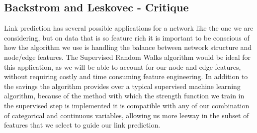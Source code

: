 \subsection{Backstrom and Leskovec - Critique}

\vspace{5mm}
\noindent
Link prediction has several possible applications for a network like the one 
we are considering, but on data that is so feature rich it is important to be 
conscious of how the algorithm we use is handling the balance between network 
structure and node/edge features.  The Supervised Random Walks algorithm would
be ideal for this application, as we will be able to account for our node and 
edge features, without requiring costly and time consuming feature engineering. 
In addition to the savings the algorithm provides over a typical supervised
machine learning algorithm, because of the method with which the strength 
function we train in the supervised step is implemented it is compatible with 
any of our combination of categorical and continuous variables, allowing us more
leeway in the subset of features that we select to guide our link prediction.



